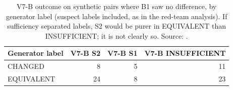 \begin{table}[t]
\centering\scriptsize
\caption{V7-B outcome on synthetic pairs where B1 saw no difference, by generator label (suspect labels included, as in the red-team analysis). If sufficiency separated labels, S2 would be purer in EQUIVALENT than INSUFFICIENT; it is not clearly so. Source: .}
\label{tab:suffsep}
\begin{tabular}{lrrr}
\hline
Generator label & V7-B S2 & V7-B S1 & V7-B INSUFFICIENT \\
\hline
CHANGED & 8 & 5 & 11 \\
EQUIVALENT & 24 & 8 & 23 \\
\hline
\end{tabular}
\end{table}
